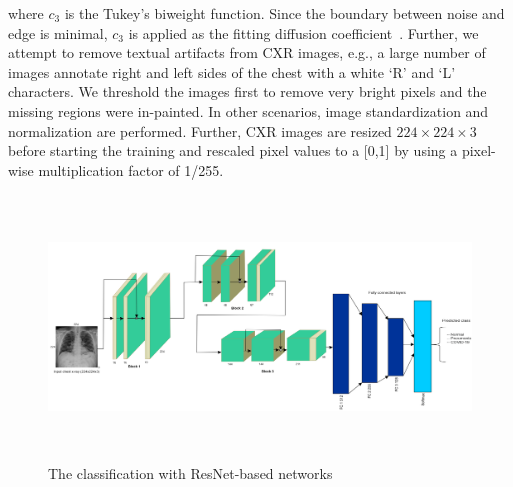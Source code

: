 \documentclass[conference]{IEEEtran}
\begin{document}
\noindent where $c_{3}$ is the Tukey's biweight function. Since the boundary between noise and edge is minimal, $c_{3}$ is applied as the fitting diffusion coefficient~\cite{95}. Further, we attempt to remove textual artifacts from CXR images, e.g., a large number of images annotate right and left sides of the chest with a white `R' and `L' characters. We threshold the images first to remove very bright pixels and the missing regions were in-painted. In other scenarios, image standardization and normalization are performed. 
Further, CXR images are resized $224 \times 224 \times 3$ before starting the training and rescaled pixel values to a [0,1] by using a pixel-wise multiplication factor of 1/255. %

\begin{figure}
	\centering
	\includegraphics[width=0.9\linewidth,height=70mm]{densenet.png}
	\caption{The classification with ResNet-based networks} 
	\label{fig:resnet}
\end{figure}
\fi
\end{document}
